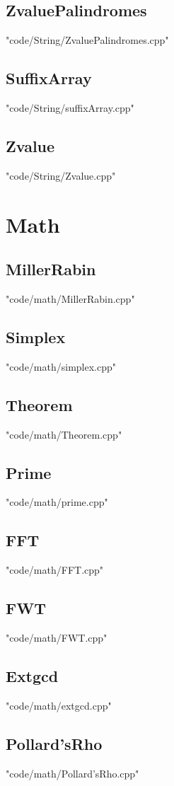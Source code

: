 \documentclass [8pt,a4paper,twocolumn]{article}
\begin{document}
\subsection{ZvaluePalindromes}
 {"code/String/ZvaluePalindromes.cpp"}
\subsection{SuffixArray}
 {"code/String/suffixArray.cpp"}
\subsection{Zvalue}
 {"code/String/Zvalue.cpp"}
\section{Math}
\subsection{MillerRabin}
 {"code/math/MillerRabin.cpp"}
\subsection{Simplex}
 {"code/math/simplex.cpp"}
\subsection{Theorem}
 {"code/math/Theorem.cpp"}
\subsection{Prime}
 {"code/math/prime.cpp"}
\subsection{FFT}
 {"code/math/FFT.cpp"}
\subsection{FWT}
 {"code/math/FWT.cpp"}
\subsection{Extgcd}
 {"code/math/extgcd.cpp"}
\subsection{Pollard’sRho}
 {"code/math/Pollard’sRho.cpp"}


\end{document}
